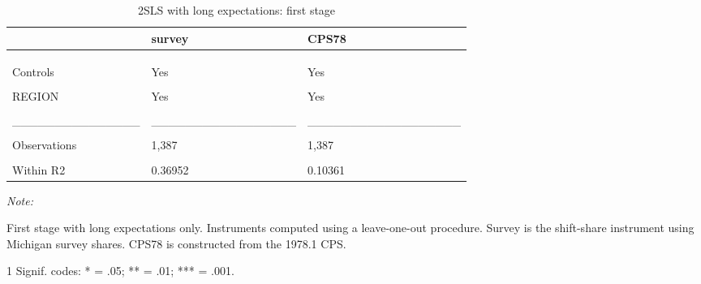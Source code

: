 \begin{table}

\caption{\label{tab:base:5only:2sls:stage1}2SLS with long expectations: first stage}
\centering
\begin{threeparttable}
\begin{tabular}[t]{lll}
\toprule
  & survey & CPS78\\
\midrule
\cellcolor{gray!6}{Dependent Var.:} & \cellcolor{gray!6}{long-run pe} & \cellcolor{gray!6}{long-run pe}\\
\addlinespace
 &  & \\
\addlinespace
\cellcolor{gray!6}{Bartik5} & \cellcolor{gray!6}{1.012*** (0.0357)} & \cellcolor{gray!6}{0.8641*** (0.0730)}\\
\addlinespace
Controls & Yes & Yes\\
\addlinespace
\cellcolor{gray!6}{Fixed-Effects:} & \cellcolor{gray!6}{-----------------} & \cellcolor{gray!6}{------------------}\\
\addlinespace
REGION & Yes & Yes\\
\addlinespace
\cellcolor{gray!6}{TIME} & \cellcolor{gray!6}{Yes} & \cellcolor{gray!6}{Yes}\\
\addlinespace
\_\_\_\_\_\_\_\_\_\_\_\_\_\_\_ & \_\_\_\_\_\_\_\_\_\_\_\_\_\_\_\_\_ & \_\_\_\_\_\_\_\_\_\_\_\_\_\_\_\_\_\_\\
\addlinespace
\cellcolor{gray!6}{S.E. type} & \cellcolor{gray!6}{Drisc.-Kra. (L=4)} & \cellcolor{gray!6}{Drisco.-Kra. (L=4)}\\
\addlinespace
Observations & 1,387 & 1,387\\
\addlinespace
\cellcolor{gray!6}{R2} & \cellcolor{gray!6}{0.60723} & \cellcolor{gray!6}{0.44158}\\
\addlinespace
Within R2 & 0.36952 & 0.10361\\
\bottomrule
\end{tabular}
\begin{tablenotes}
\item \textit{Note: } 
\item First stage with long expectations only. Instruments computed using a leave-one-out procedure. Survey is the shift-share instrument using Michigan survey shares. CPS78 is constructed from the 1978.1 CPS.
\item[1] Signif. codes: * = .05; ** = .01; *** = .001.
\end{tablenotes}
\end{threeparttable}
\end{table}
